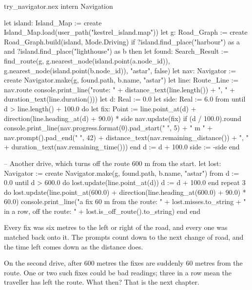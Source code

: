 \begin{tryit}{try_navigator.nex}
intern Navigation

let island: Island_Map := create Island_Map.load(user_path("kestrel_island.map"))
let g: Road_Graph := create Road_Graph.build(island, Mode.Driving)
if ?island.find_place("harbour") as a and ?island.find_place("lighthouse") as b then
  let found: Search_Result := find_route(g, g.nearest_node(island.point(a.node_id)),
    g.nearest_node(island.point(b.node_id)), "astar", false)
  let nav: Navigator := create Navigator.make(g, found.path, b.name, "astar")
  let line: Route_Line := nav.route
  console.print_line("route: " + distance_text(line.length()) + ", " + duration_text(line.duration()))
  let d: Real := 0.0
  let side: Real := 6.0
  from
  until
    d > line.length() + 100.0
  do
    let fix: Point := line.point_at(d) + direction(line.heading_at(d) + 90.0) * side
    nav.update(fix)
    if (d / 100.0).round %
      console.print_line(nav.progress.format(0).pad_start(" ", 5) + " m  " + nav.prompt().pad_end(" ", 42)
        + distance_text(nav.remaining_distance()) + ", " + duration_text(nav.remaining_time()))
    end
    d := d + 100.0
    side := -side
  end

  -- Another drive, which turns off the route 600 m from the start.
  let lost: Navigator := create Navigator.make(g, found.path, b.name, "astar")
  from
    d := 0.0
  until
    d > 600.0
  do
    lost.update(line.point_at(d))
    d := d + 100.0
  end
  repeat 3 do
    lost.update(line.point_at(600.0) + direction(line.heading_at(600.0) + 90.0) * 60.0)
    console.print_line("a fix 60 m from the route: " + lost.misses.to_string + " in a row, off the route: "
      + lost.is_off_route().to_string)
  end
end
\end{tryit}

Every fix was six metres to the left or right of the road, and every one
was matched back onto it. The prompts count down to the next change of
road, and the time left comes down as the distance does.

On the second drive, after 600 metres the fixes are suddenly 60 metres
from the route. One or two such fixes could be bad readings; three in a
row mean the traveller has left the route. What then? That is the next
chapter.
